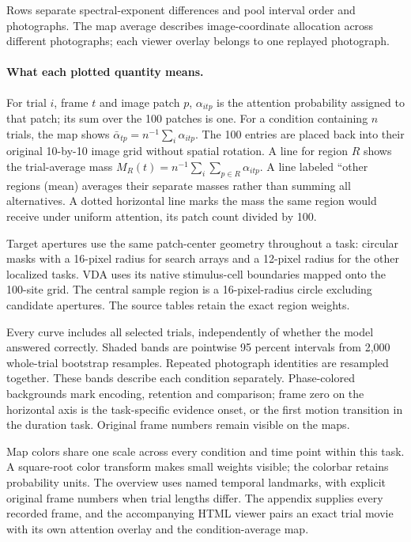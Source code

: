 \documentclass[11pt]{article}
\begin{document}
Rows separate spectral-exponent differences and pool interval order and photographs. The map average describes image-coordinate allocation across different photographs; each viewer overlay belongs to one replayed photograph.

\paragraph{What each plotted quantity means.}
For trial $i$, frame $t$ and image patch $p$, $\alpha_{itp}$ is the attention probability assigned to that patch; its sum over the 100 patches is one. For a condition containing $n$ trials, the map shows $\bar\alpha_{tp}=n^{-1}\sum_i\alpha_{itp}$. The 100 entries are placed back into their original 10-by-10 image grid without spatial rotation. A line for region $R$ shows the trial-average mass $M_R(t)=n^{-1}\sum_i\sum_{p\in R}\alpha_{itp}$. A line labeled ``other regions (mean) averages their separate masses rather than summing all alternatives. A dotted horizontal line marks the mass the same region would receive under uniform attention, its patch count divided by 100.

Target apertures use the same patch-center geometry throughout a task: circular masks with a 16-pixel radius for search arrays and a 12-pixel radius for the other localized tasks. VDA uses its native stimulus-cell boundaries mapped onto the 100-site grid. The central sample region is a 16-pixel-radius circle excluding candidate apertures. The source tables retain the exact region weights.

Every curve includes all selected trials, independently of whether the model answered correctly. Shaded bands are pointwise 95 percent intervals from 2,000 whole-trial bootstrap resamples. Repeated photograph identities are resampled together. These bands describe each condition separately. Phase-colored backgrounds mark encoding, retention and comparison; frame zero on the horizontal axis is the task-specific evidence onset, or the first motion transition in the duration task. Original frame numbers remain visible on the maps.

Map colors share one scale across every condition and time point within this task. A square-root color transform makes small weights visible; the colorbar retains probability units. The overview uses named temporal landmarks, with explicit original frame numbers when trial lengths differ. The appendix supplies every recorded frame, and the accompanying HTML viewer pairs an exact trial movie with its own attention overlay and the condition-average map.
\end{document}
